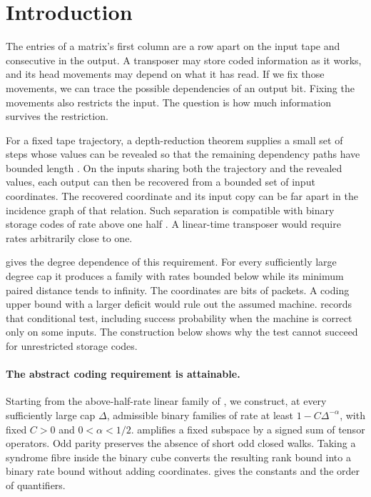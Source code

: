 \section{Introduction}\label{sec:introduction}

The entries of a matrix's first column are a row apart on the input tape
and consecutive in the output. A transposer may store coded information
as it works, and its head movements may depend on what it has read. If
we fix those movements, we can trace the possible dependencies of an
output bit. Fixing the movements also restricts the input. The question
is how much information survives the restriction.

For a fixed tape trajectory, a depth-reduction theorem supplies a small
set of steps whose values can be revealed so that the remaining
dependency paths have bounded length \cite[Corollary~O]{PaperFourteen}.
On the inputs sharing both the trajectory and the revealed values, each
output can then be recovered from a bounded set of input coordinates.
The recovered coordinate and its input copy can be far apart in the
incidence graph of that relation. Such separation is compatible with
binary storage codes of rate above one half
\cite[Corollary~A$'$]{PaperThirteen}. A linear-time transposer would
require rates arbitrarily close to one.

 gives the degree dependence of this requirement. For
every sufficiently large degree cap it produces a family with rates
bounded below while its minimum paired distance tends to infinity. The
coordinates are bits of packets. A coding upper bound with a larger
deficit would rule out the assumed machine.  records that
conditional test, including success probability when the machine is
correct only on some inputs. The construction below shows why the test
cannot succeed for unrestricted storage codes.

\paragraph{The abstract coding requirement is attainable.}
Starting from the above-half-rate linear family of
\cite[Corollary~U(a,b)]{PaperThirteen}, we construct, at every sufficiently
large cap $\Delta$, admissible binary families of rate at least
$1-C\Delta^{-\alpha}$, with fixed $C>0$ and $0<\alpha<1/2$.
 amplifies a fixed subspace by a signed sum of tensor
operators. Odd parity preserves the absence of short odd closed walks.
Taking a syndrome fibre inside the binary cube converts the resulting
rank bound into a binary rate bound without adding coordinates.
 gives the constants and the order of quantifiers.

